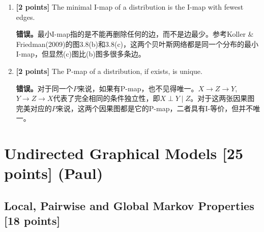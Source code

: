 \documentclass[12pt]{article}
\begin{document}
\begin{enumerate}
	\item \textbf{[2 points]} The minimal I-map of a distribution is the I-map with fewest edges.

	      \begin{solution}
		      \textbf{错误。}最小I-map指的是不能再删除任何的边，而不是边最少。参考Koller \& Friedman(2009)的图3.8(b)和3.8(c)，这两个贝叶斯网络都是同一个分布的最小I-map，但显然(c)图比(b)图多很多条边。
	      \end{solution}

	\item \textbf{[2 points]} The P-map of a distribution, if exists, is unique.

	      \begin{solution}
		      \textbf{错误。}对于同一个$P$来说，如果有P-map，也不见得唯一。$X \to Z \to Y$, $Y \to Z \to X$代表了完全相同的条件独立性，即$X \perp Y \mid Z$。对于这两张因果图完美对应的$P$来说，这两个因果图都是它的P-map，二者具有I-等价，但并不唯一。
	      \end{solution}

\end{enumerate}


\newpage


\section{Undirected Graphical Models [25 points] (Paul)}

\subsection{Local, Pairwise and Global Markov Properties [18 points]}
\end{document}
